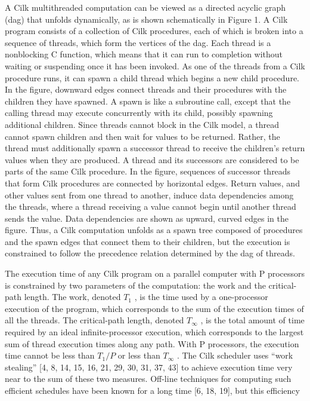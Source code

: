 \documentclass[
]{article}
\begin{document}
A Cilk multithreaded computation can be viewed as a directed acyclic
graph (dag) that unfolds dynamically, as is shown schematically in
Figure 1. A Cilk program consists of a collection of Cilk procedures,
each of which is broken into a sequence of threads, which form the
vertices of the dag. Each thread is a nonblocking C function, which
means that it can run to completion without waiting or suspending once
it has been invoked. As one of the threads from a Cilk procedure runs,
it can spawn a child thread which begins a new child procedure. In the
figure, downward edges connect threads and their procedures with the
children they have spawned. A spawn is like a subroutine call, except
that the calling thread may execute concurrently with its child,
possibly spawning additional children. Since threads cannot block in the
Cilk model, a thread cannot spawn children and then wait for values to
be returned. Rather, the thread must additionally spawn a successor
thread to receive the children's return values when they are produced. A
thread and its successors are considered to be parts of the same Cilk
procedure. In the figure, sequences of successor threads that form Cilk
procedures are connected by horizontal edges. Return values, and other
values sent from one thread to another, induce data dependencies among
the threads, where a thread receiving a value cannot begin until another
thread sends the value. Data dependencies are shown as upward, curved
edges in the figure. Thus, a Cilk computation unfolds as a spawn tree
composed of procedures and the spawn edges that connect them to their
children, but the execution is constrained to follow the precedence
relation determined by the dag of threads.

The execution time of any Cilk program on a parallel computer with P
processors is constrained by two parameters of the computation: the work
and the critical-path length. The work, denoted \(T_{1}\) , is the time
used by a one-processor execution of the program, which corresponds to
the sum of the execution times of all the threads. The critical-path
length, denoted \(T_{\infty}\) , is the total amount of time required by
an ideal infinite-processor execution, which corresponds to the largest
sum of thread execution times along any path. With P processors, the
execution time cannot be less than \(T_{1}/P\) or less than
\(T_{\infty}\) . The Cilk scheduler uses ``work stealing'' {[}4, 8, 14,
15, 16, 21, 29, 30, 31, 37, 43{]} to achieve execution time very near to
the sum of these two measures. Off-line techniques for computing such
efficient schedules have been known for a long time {[}6, 18, 19{]}, but
this efficiency
\end{document}
